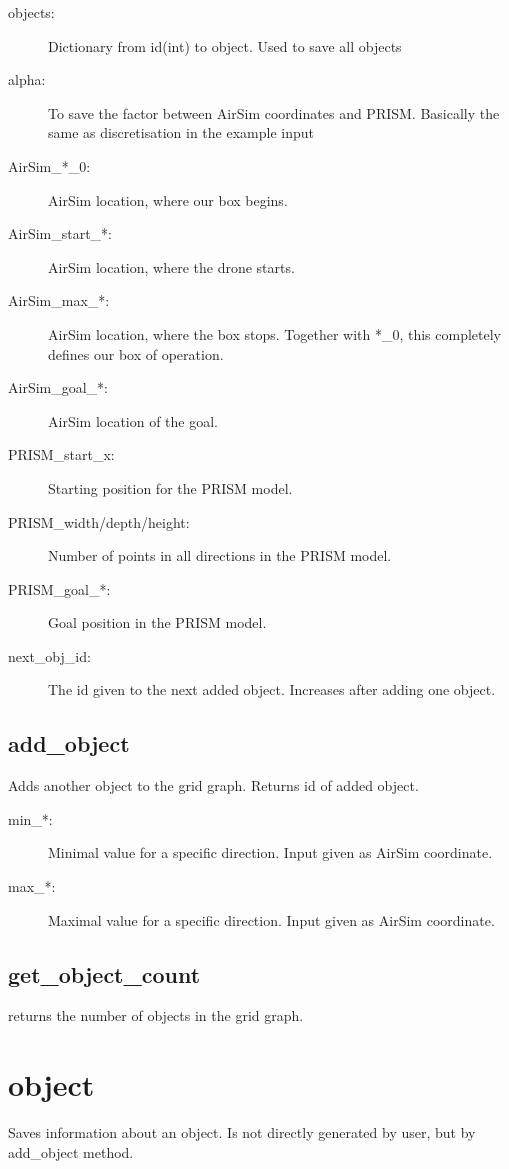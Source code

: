 \documentclass{article}
\begin{document}
\begin{description}
    \item[objects:] Dictionary from id(int) to object. Used to save all objects
    \item[alpha:] To save the factor between AirSim coordinates and PRISM. Basically the same as discretisation in the example input
    \item[AirSim\_*\_0:] AirSim location, where our box begins.
    \item[AirSim\_start\_*:] AirSim location, where the drone starts.
    \item[AirSim\_max\_*:] AirSim location, where the box stops. Together with *\_0, this completely defines our box of operation.
    \item[AirSim\_goal\_*:] AirSim location of the goal.
    \item[PRISM\_start\_x:] Starting position for the PRISM model.
    \item[PRISM\_width/depth/height:] Number of points in all directions in the PRISM model.
    \item[PRISM\_goal\_*:] Goal position in the PRISM model.
    \item[next\_obj\_id:] The id given to the next added object. Increases after adding one object.
\end{description}

\subsection{add\_object}
Adds another object to the grid graph. Returns id of added object.

\begin{description}
    \item[min\_*:] Minimal value for a specific direction. Input given as AirSim coordinate.
    \item[max\_*:] Maximal value for a specific direction. Input given as AirSim coordinate.
\end{description}

\subsection{get\_object\_count}
returns the number of objects in the grid graph.

\section{object}
Saves information about an object. Is not directly generated by user, but by add\_object method.
\end{document}
